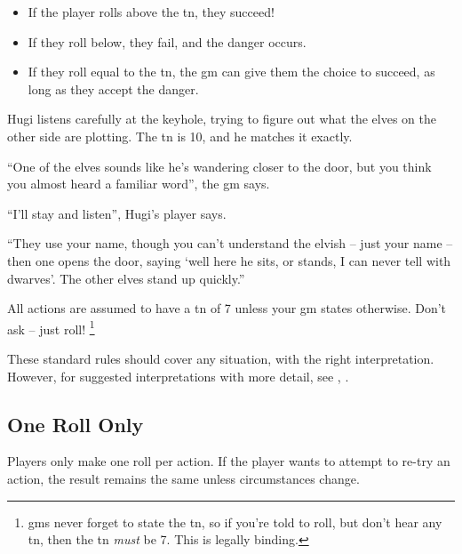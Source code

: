 \begin{multicols}{2}
\begin{multicols}{2}
\begin{itemize}

  \item
  If the player rolls above the \gls{tn}, they succeed!
  \item
  If they roll below, they fail, and the danger occurs.
  \item
  If they roll equal to the \gls{tn}, the \gls{gm} can give them the choice to succeed, as long as they accept the danger.

\end{itemize}

\columnbreak

\noindent
\TNChart

\end{multicols}

\begin{exampletext}
  Hugi listens carefully at the keyhole, trying to figure out what the elves on the other side are plotting.
  The \gls{tn} is 10, and he matches it exactly.

  ``One of the elves sounds like he's wandering closer to the door, but you think you almost heard a familiar word'', the \gls{gm} says.

  ``I'll stay and listen'', Hugi's player says.

  ``They use your name, though you can't understand the elvish -- just your name -- then one opens the door, saying `well here he sits, or stands, I can never tell with dwarves'.
  The other elves stand up quickly.''

\end{exampletext}

All actions are assumed to have a \gls{tn} of 7 unless your \gls{gm} states otherwise.
Don't ask -- just roll!%
\footnote{\Glspl{gm} never forget to state the \gls{tn}, so if you're told to roll, but don't hear any \gls{tn}, then the \gls{tn} \emph{must} be 7.
This is legally binding.}

These standard rules should cover any situation, with the right interpretation.
However, for suggested interpretations with more detail, see , .

\subsection{One Roll Only}

Players only make one roll per action.
If the player wants to attempt to re-try an action, the result remains the same unless circumstances change.


\end{multicols}
